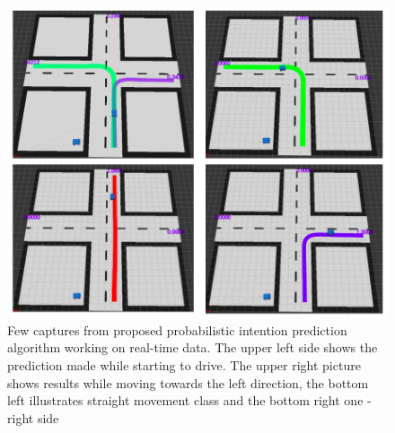 \begin{figure}[H]
	\centering  	
	\includegraphics[width=14cm]{img/reallifeExperiments.png}
	\caption{Few captures from proposed probabilistic intention prediction algorithm working on real-time data. The upper left side shows the prediction made while starting to drive. The upper right picture shows results while moving towards the left direction, the bottom left illustrates straight movement class and the bottom right one - right side}
	\label{fig:inROS}    
\end{figure}




